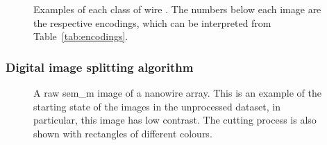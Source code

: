 \begin{figure}
    \caption[Examples of each class of wire.]{Examples of each class of wire \cite{Brugnolotto2024}. The numbers below each image are the respective encodings, which can be interpreted from Table~\ref{tab:encodings}.}
    \label{fig:class_examples}
\end{figure}

\subsubsection{Digital image splitting algorithm}

\begin{figure}
    \centering
    \caption[An unprocessed \acs{sem_m} image of a nanowire array.]{A raw \acs{sem_m} image of a nanowire array. This is an example of the starting state of the images in the unprocessed dataset, in particular, this image has low contrast. The cutting process is also shown with rectangles of different colours.}
    \label{fig:raw_image}
\end{figure}

